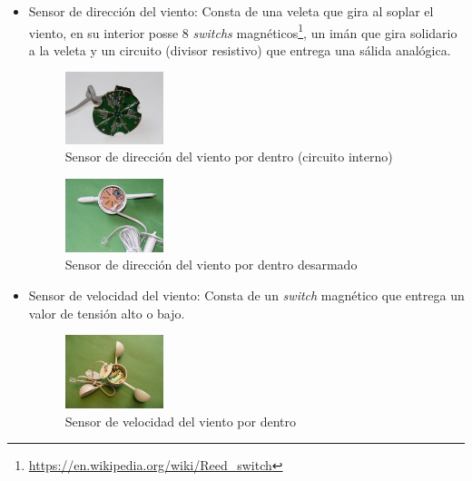\documentclass[10pt]{article}
\begin{document}
\begin{itemize}
   \item Sensor de dirección del viento: Consta de una veleta que gira al soplar el viento, en su interior posse 8 \textit{switchs} magnéticos\footnote{\url{https://en.wikipedia.org/wiki/Reed_switch}}, un imán que gira solidario a la veleta y un circuito (divisor resistivo) que entrega una sálida analógica.
               \begin{figure}[H]
                  \centering
                  \includegraphics[width=0.27\textwidth]{./Images/winddir1.jpg}
                  \caption{Sensor de dirección del viento por dentro (circuito interno)}\label{fig:veleta_por_dentro}
               \end{figure}
               \begin{figure}[H]
                  \centering
                  \includegraphics[width=0.27\textwidth]{./Images/winddir2.jpg}
                  \caption{Sensor de dirección del viento por dentro desarmado}\label{fig:veleta_por_dentro2}
               \end{figure}
            \item Sensor de velocidad del viento: Consta de un \textit{switch} magnético que entrega un valor de tensión alto o bajo.
               \begin{figure}[H]
                  \centering
                  \includegraphics[width=0.27\textwidth]{./Images/windspeed1.jpg}
                  \caption{Sensor de velocidad del viento por dentro}\label{fig:anemometro}
               \end{figure}
               \begin{figure}[H]

\end{figure}
\end{itemize}
\end{document}
